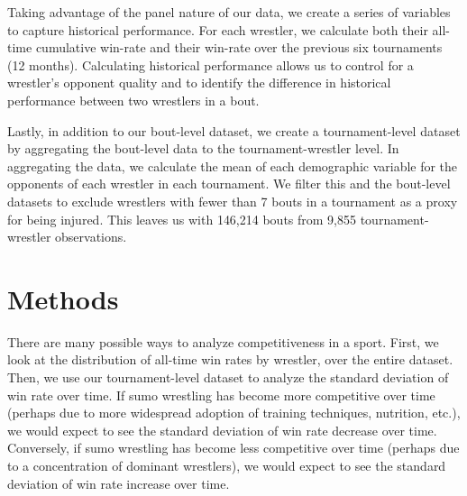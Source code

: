 \documentclass[12pt]{article}
\begin{document}
Taking advantage of the panel nature of our data, we create a series of variables to capture historical performance. For each wrestler, we calculate both their all-time cumulative win-rate and their win-rate over the previous six tournaments (12 months). Calculating historical performance allows us to control for a wrestler's opponent quality and to identify the difference in historical performance between two wrestlers in a bout. 

Lastly, in addition to our bout-level dataset, we create a tournament-level dataset by aggregating the bout-level data to the tournament-wrestler level. In aggregating the data, we calculate the mean of each demographic variable for the opponents of each wrestler in each tournament. We filter this and the bout-level datasets to exclude wrestlers with fewer than 7 bouts in a tournament as a proxy for being injured. This leaves us with 146,214 bouts from 9,855 tournament-wrestler observations.

\section{Methods}
\label{section:methods}

There are many possible ways to analyze competitiveness in a sport. First, we look at the distribution of all-time win rates by wrestler, over the entire dataset. Then, we use our tournament-level dataset to analyze the standard deviation of win rate over time. If sumo wrestling has become more competitive over time (perhaps due to more widespread adoption of training techniques, nutrition, etc.), we would expect to see the standard deviation of win rate decrease over time. Conversely, if sumo wrestling has become less competitive over time (perhaps due to a concentration of dominant wrestlers), we would expect to see the standard deviation of win rate increase over time.
\end{document}
